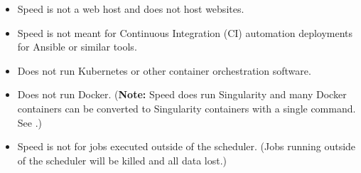 
\begin{itemize}
    \item Speed is not a web host and does not host websites.
    \item Speed is not meant for Continuous Integration (CI) automation deployments for Ansible or similar tools. 
    \item Does not run Kubernetes or other container orchestration software.
    \item Does not run Docker. (\textbf{Note:} Speed does run Singularity and many Docker containers can be converted to Singularity containers with a single command. See .)
    \item Speed is not for jobs executed outside of the scheduler. (Jobs running outside of the scheduler will be killed and all data lost.)
\end{itemize}